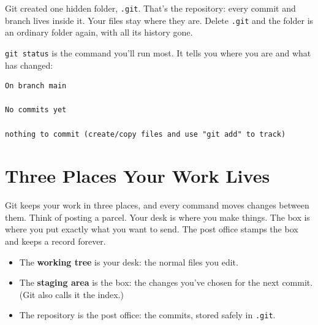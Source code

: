 Git created one hidden folder, \texttt{.git}. That's the repository: every commit and branch lives inside it. Your files stay where they are. Delete \texttt{.git} and the folder is an ordinary folder again, with all its history gone.


\texttt{git\ status} is the command you'll run most. It tells you where you are and what has changed:

\begin{codeblock}

\begin{Shaded}
\begin{Highlighting}[]
\end{Highlighting}
\end{Shaded}

\end{codeblock}

\begin{codeblock}
\begin{Verbatim}[formatcom=\outputstyle]
On branch main

No commits yet

nothing to commit (create/copy files and use "git add" to track)
\end{Verbatim}
\end{codeblock}

\section{Three Places Your Work Lives}\label{08-git-every-day:three-places-your-work-lives}

Git keeps your work in three places, and every command moves changes between them. Think of posting a parcel. Your desk is where you make things. The box is where you put exactly what you want to send. The post office stamps the box and keeps a record forever.

\begin{itemize}
\tightlist
\item
  The \textbf{working tree} is your desk: the normal files you edit.
\item
  The \textbf{staging area} is the box: the changes you've chosen for the next commit. (Git also calls it the index.)
\item
  The repository is the post office: the commits, stored safely in \texttt{.git}.
\end{itemize}


